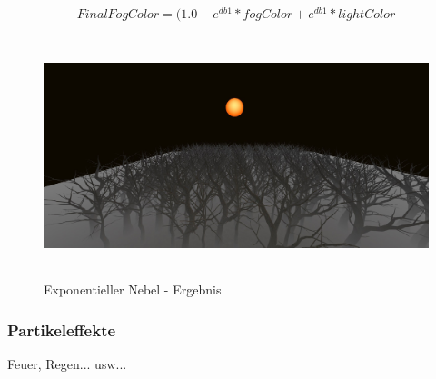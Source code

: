 \[
FinalFogColor = (1.0-e^{db\textrm{1}}*fogColor + e^{db\textrm{1}} * lightColor
\]

\begin{figure}[h!]
	\myfloatalign
	\caption{Exponentieller Nebel - Ergebnis}
	
	\includegraphics[width=.9\linewidth, height = 200pt]{images/fog} 
	
\end{figure}

\subsubsection{Partikeleffekte}
Feuer, Regen... usw...


